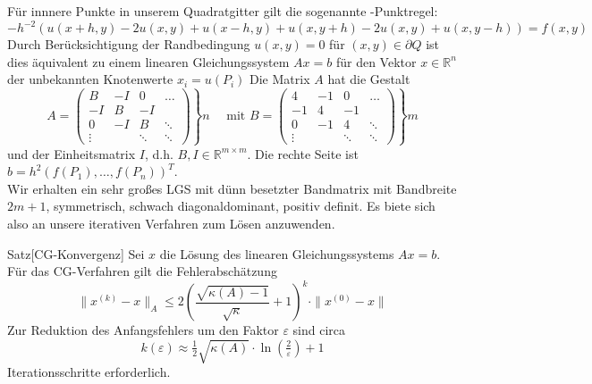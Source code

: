\documentclass{article}
\begin{document}
\begin{egbox}
\begin{center}
        \end{center}
        Für innnere Punkte in unserem Quadratgitter gilt die sogenannte -Punktregel\grqq{}:
        \[-h^{-2}\left(u(x+h,y)-2u(x,y)+u(x-h,y)+u(x,y+h)-2u(x,y)+u(x,y-h)\right)=f(x,y)\]
        Durch Berücksichtigung der Randbedingung $u(x,y)=0$ für $(x,y)\in\partial Q$ ist dies äquivalent zu einem 
        linearen Gleichungssystem $Ax=b$ für den Vektor $x\in\mathbb{R}^n$ der unbekannten Knotenwerte 
        $x_i=u(P_i)$
        Die Matrix $A$ hat die Gestalt
        \[A = \left.\begin{pmatrix}
            B & -I & 0 & \dots\\
            -I & B & -I & \\
            0 & -I & B & \ddots \\
            \vdots& & \ddots & \ddots
        \end{pmatrix}\right\} n \quad \text{ mit } B = \left.\begin{pmatrix}
            4 & -1 & 0 & \dots\\
            -1 & 4 & -1 & \\
            0 & -1 & 4 & \ddots \\
            \vdots& & \ddots & \ddots
        \end{pmatrix}\right\}m\]
        und der Einheitsmatrix $I$, d.h. $B,I\in\mathbb{R}^{m\times m}$. 
        Die rechte Seite ist $b=h^2(f(P_1),\dotsc,f(P_n))^T$. \\
        Wir erhalten ein sehr großes LGS mit dünn besetzter Bandmatrix mit Bandbreite $2m+1$, symmetrisch, 
        schwach diagonaldominant, positiv definit. Es biete sich also an unsere iterativen Verfahren zum Lösen 
        anzuwenden.
    \end{egbox}
    \newpage
    \begin{thmbox}{Satz}[CG-Konvergenz]
        Sei $x$ die Lösung des linearen Gleichungssystems $Ax=b$. Für das CG-Verfahren gilt die Fehlerabschätzung
        \[\|x^{(k)} - x\|_A \leq 2\left(\dfrac{\sqrt{\kappa(A)-1}}{\sqrt{\kappa}}+1\right)^k \cdot \|x^{(0)}-x\|\]
        Zur Reduktion des Anfangsfehlers um den Faktor $\varepsilon$ sind circa 
        \[k(\varepsilon)\approx \tfrac{1}{2}\sqrt{\kappa(A)}\cdot \ln(\tfrac{2}{\varepsilon}) +1 \]
        Iterationsschritte erforderlich. 
    \end{thmbox}
\end{document}
